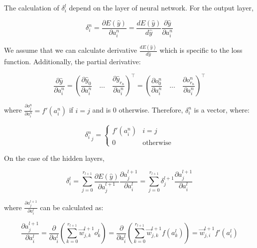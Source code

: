 \documentclass[12pt,a4paper,]{report}
\begin{document}
The calculation of \(\delta^l_i\) depend on the layer of neural network.
For the output layer,

\begin{equation}
    \delta^n_i = \frac{\partial E(\hat{y})}{\partial a^n_i} = \frac{d E(\hat{y})}{d \hat{y}} \frac{\partial \hat{y}}{\partial a^n_i}
\end{equation}

We assume that we can calculate derivative
\(\frac{d E(\hat{y})}{d \hat{y}}\) which is specific to the loss
function. Additionally, the partial derivative:

\begin{equation}
\frac{\partial \hat{y}}{\partial a^n_i} 
= (\frac{\partial \hat{y}_0}{\partial a^n_i} \quad ... \quad \frac{\partial \hat{y}_{r_n}}{\partial a^n_i})^\intercal
= (\frac{\partial o^n_0}{\partial a^n_i} \quad ... \quad \frac{\partial o^n_{r_n}}{\partial a^n_i})^\intercal
\end{equation}

where \(\frac{\partial o^n_j}{\partial a^n_i} = f'(a^n_i)\) if \(i = j\)
and is 0 otherwise. Therefore, \(\delta^n_i\) is a vector, where:

\begin{equation}
    {\delta^n_i}_{j} = \begin{cases}
        f'(a^n_i) & i = j \\
        0 & \text{otherwise}
    \end{cases} \label{eq:bp_output}
\end{equation}

On the case of the hidden layers,

\begin{equation}
    \delta^l_i
    = \sum_{j=0}^{r_{l+1}} \frac{\partial E(\hat{y})}{\partial a^{l+1}_j} \frac{\partial a^{l+1}_j}{\partial a^{l}_i} 
    = \sum_{j=0}^{r_{l+1}} \delta^{l+1}_j \frac{\partial a^{l+1}_j}{\partial a^{l}_i}
\end{equation}

where \(\frac{\partial a^{l+1}_j}{\partial a^{l}_i}\) can be calculated
as:

\begin{equation}
    \frac{\partial a^{l+1}_j}{\partial a^{l}_i}
    = \frac{\partial}{\partial a^{l}_i} (\sum_{k=0}^{r_{l+1}} \vec{w}^{l+1}_{j, k} o^{l}_k)
    = \frac{\partial}{\partial a^{l}_i} (\sum_{k=0}^{r_{l+1}} \vec{w}^{l+1}_{j, k} f(a^{l}_k))
    = \vec{w}^{l+1}_{j, i} f'(a^{l}_i)
\end{equation}
\end{document}
